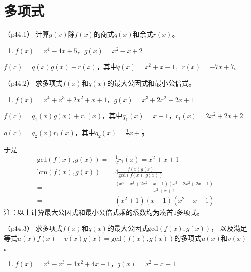 \documentclass[12pt, a4paper, oneside, UTF8]{ctexbook}
\begin{document}
\else
\fi

\chapter{多项式}
\begin{question}（p44.1）
计算$g(x)$除$f(x)$的商式$q(x)$和余式$r(x)$。
\begin{enumerate}[label=(\arabic*)]
    \item $f(x)=x^4-4x+5$，$g(x)=x^2-x+2$
\end{enumerate}
\end{question}

\begin{solution}
    $f(x)=q(x)g(x)+r(x)$，其中$q(x)=x^2+x-1$，$r(x)=-7x+7$。
    
\end{solution}

\begin{question}（p44.2）
    求多项式$f(x)$和$g(x)$的最大公因式和最小公倍式。
    \begin{enumerate}[label=(\arabic*)]
        \item $f(x)=x^4+x^3+2x^2+x+1$，$g(x)=x^3+2x^2+2x+1$
    \end{enumerate}
\end{question}

\begin{solution}
    $f(x)=q_1(x)g(x)+r_1(x)$，其中$q_1(x)=x-1$，$r_1(x)=2x^2+2x+2$

    $g(x)=q_2(x)r_1(x)$，其中$q_2(x)=\frac{1}{2}x+\frac{1}{2}$

    于是
    \begin{align*}
        \mathrm{gcd}(f(x),g(x))=&\frac{1}{2} r_1(x)=x^2+x+1 \\
        \mathrm{lcm}(f(x),g(x))=&4\frac{f(x)g(x)}{\mathrm{gcd}(f(x),g(x))} \\
        =&\frac{(x^4+x^3+2x^2+x+1)(x^3+2x^2+2x+1)}{x^2+x+1}\\
        =&(x^2+1)(x+1)(x^2+x+1)
    \end{align*}
    注：以上计算最大公因式和最小公倍式乘的系数均为凑首$1$多项式。

\end{solution}



\begin{question}（p44.3）
求多项式$f(x)$和$g(x)$的最大公因式$\mathrm{gcd}(f(x),g(x))$，
以及满足等式$u(x)f(x)+v(x)g(x)=\mathrm{gcd}(f(x),g(x))$的多项式$u(x)$和$v(x)$。
\begin{enumerate}[label=(\arabic*)]
    \item $f(x)=x^4-x^3-4x^2+4x+1$，$g(x)=x^2-x-1$
\end{enumerate}
\end{question}
\end{document}
